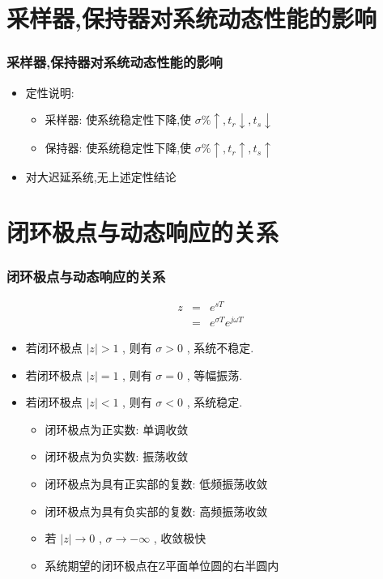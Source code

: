 \documentclass[table]{beamer}
\begin{document}
\section{采样器,保持器对系统动态性能的影响}
\label{sec-2}
\begin{frame}
\frametitle{采样器,保持器对系统动态性能的影响}
\label{sec-2-1}

\begin{itemize}
\item 定性说明:
\begin{itemize}
\item 采样器: 使系统稳定性下降,使  $\sigma\%\uparrow,t_r\downarrow,t_s\downarrow$
\item <2->保持器: 使系统稳定性下降,使  $\sigma\%\uparrow,t_r\uparrow,t_s\uparrow$
\end{itemize}
\item <3->对大迟延系统,无上述定性结论
\end{itemize}
\end{frame}
\section{闭环极点与动态响应的关系}
\label{sec-3}
\begin{frame}
\frametitle{闭环极点与动态响应的关系}
\label{sec-3-1}

\begin{eqnarray*}
z & = & e^{sT}\\
 &=& e^{\sigma T}e^{j\omega T}
\end{eqnarray*}

\begin{itemize}
\item 若闭环极点  $|z|>1$  , 则有  $\sigma>0$  , 系统不稳定.
\item 若闭环极点  $|z|=1$  , 则有  $\sigma=0$  , 等幅振荡.
\item 若闭环极点  $|z|<1$  , 则有  $\sigma<0$  , 系统稳定.
\begin{itemize}
\item <2->闭环极点为正实数: 单调收敛
\item <2->闭环极点为负实数: 振荡收敛
\item <2->闭环极点为具有正实部的复数: 低频振荡收敛
\item <2->闭环极点为具有负实部的复数: 高频振荡收敛
\item <2->若  $|z|\rightarrow 0$  ,  $\sigma\rightarrow -\infty$ , 收敛极快
\item <3->系统期望的闭环极点在Z平面单位圆的右半圆内
\end{itemize}
\end{itemize}
\end{frame}
\end{document}
